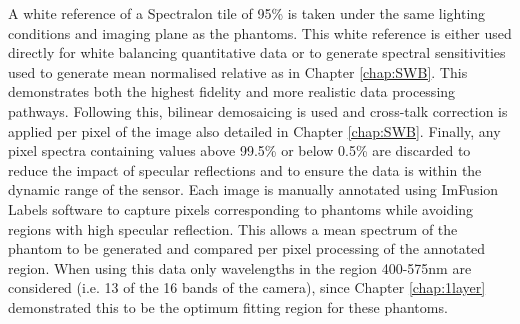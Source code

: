 A white reference of a Spectralon tile of 95\% is taken under the same lighting conditions and imaging plane as the phantoms. This white reference is either used directly for white balancing quantitative data or to generate spectral sensitivities used to generate mean normalised relative as in Chapter \ref{chap:SWB}. This demonstrates both the highest fidelity and more realistic data processing pathways. Following this, bilinear demosaicing is used and cross-talk correction is applied per pixel of the image also detailed in Chapter \ref{chap:SWB}. Finally, any pixel spectra containing values above 99.5\% or below 0.5\% are discarded to reduce the impact of specular reflections and to ensure the data is within the dynamic range of the sensor. 
Each image is manually annotated using ImFusion Labels software to capture pixels corresponding to phantoms while avoiding regions with high specular reflection. This allows a mean spectrum of the phantom to be generated and compared per pixel processing of the annotated region. When using this data only wavelengths in the region 400-575nm are considered (i.e. 13 of the 16 bands of the camera), since Chapter \ref{chap:1layer} demonstrated this to be the optimum fitting region for these phantoms. 

